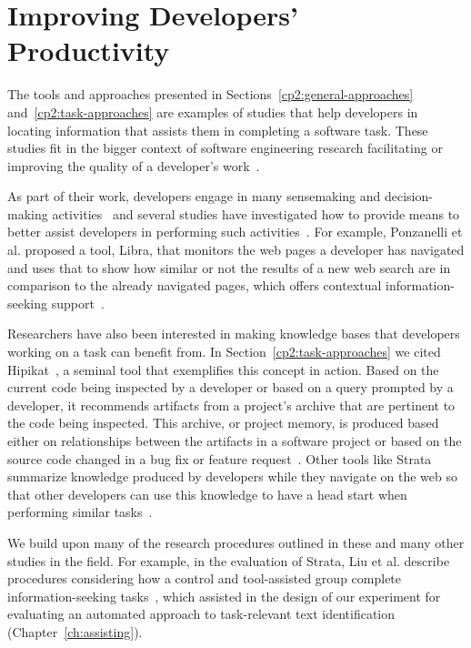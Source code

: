 



\section{Improving Developers' Productivity}
\label{cp2:dev-productivity}



The tools and approaches presented in Sections~\ref{cp2:general-approaches}
and~\ref{cp2:task-approaches}
are examples of studies that help developers in locating 
information that assists them in completing a software task.
These studies fit in the bigger context 
of software engineering research 
facilitating or improving the quality of a developer's work~\cite{Kersten2006, Meyer2017, satterfield2020}. 





As part of their work, developers engage in many sensemaking and decision-making activities~\cite{sillito2006} and several studies have investigated how to 
provide means to better  
assist developers in performing such activities~\cite{Liu2018Unakite, liu2021, barnett2015}.
For example, 
Ponzanelli et al. proposed a tool, Libra, that monitors the web pages a developer 
has navigated and uses that to show 
how similar or not the results of a new web search are in comparison to the already navigated 
pages, which offers contextual information-seeking support~\cite{Ponzanelli2017}.



Researchers have also been interested in 
making knowledge bases
that developers working on a task can benefit from. 
In Section~\ref{cp2:task-approaches} 
we cited Hipikat~\cite{Cubranic2005}, a seminal tool that exemplifies this concept in action.
Based on the current code being inspected by a developer or based on a query prompted by a developer, 
it recommends artifacts from a project's archive 
that are pertinent to the code being inspected.
This archive, or project memory, is produced 
based either on relationships between the artifacts in a software project 
or based on the source code changed in a bug fix or feature request~\cite{Cubranic2005}.
Other tools like Strata summarize knowledge produced by developers 
while they navigate on the web so that other developers
can use this knowledge to have a 
 head start when performing similar tasks~\cite{liu2021}.




We build upon many of the research procedures outlined 
in these and many other studies in the field. 
For example, in the evaluation of Strata, 
 Liu et al. describe procedures 
considering how a control and tool-assisted group 
complete information-seeking tasks~\cite{liu2021},
which assisted in the design of our experiment for 
evaluating an automated approach to
task-relevant text identification (Chapter~\ref{ch:assisting}).



